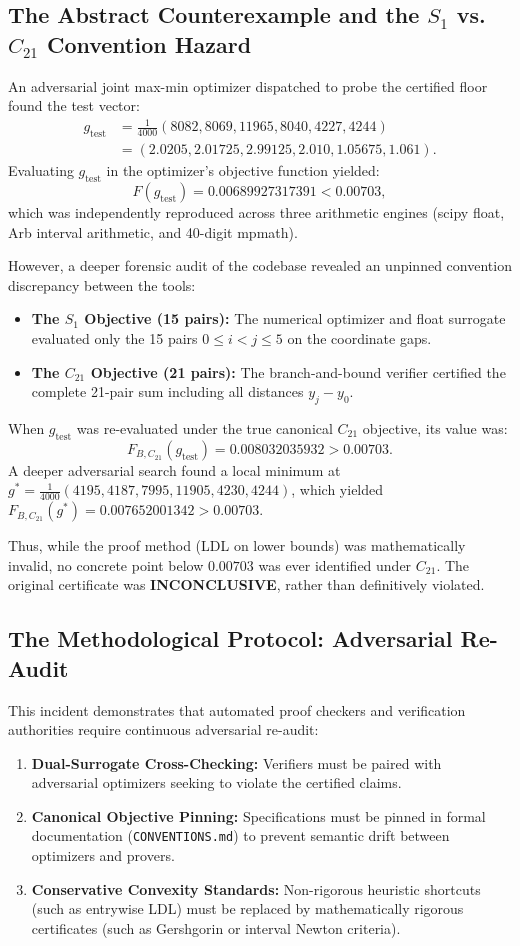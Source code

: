 \documentclass[11pt,a4paper]{article}
\theoremstyle{remark}
\begin{document}
\subsection{The Abstract Counterexample and the $S_1$ vs.\ $C_{21}$ Convention Hazard}
An adversarial joint max-min optimizer dispatched to probe the certified floor found the test vector:
\begin{align*}
 g_{\text{test}} &= \frac{1}{4000}\left(8082, 8069, 11965, 8040, 4227, 4244\right) \\
 &= \left(2.0205, 2.01725, 2.99125, 2.010, 1.05675, 1.061\right).
\end{align*}
Evaluating $g_{\text{test}}$ in the optimizer's objective function yielded:
\[
 F(g_{\text{test}}) = 0.00689927317391 < 0.00703,
\]
which was independently reproduced across three arithmetic engines (scipy float, Arb interval arithmetic, and 40-digit mpmath).

However, a deeper forensic audit of the codebase revealed an unpinned convention discrepancy between the tools:
\begin{itemize}
\item \textbf{The $S_1$ Objective (15 pairs):} The numerical optimizer and float surrogate evaluated only the 15 pairs $0 \le i < j \le 5$ on the coordinate gaps.
\item \textbf{The $C_{21}$ Objective (21 pairs):} The branch-and-bound verifier certified the complete 21-pair sum including all distances $y_j - y_0$.
\end{itemize}
When $g_{\text{test}}$ was re-evaluated under the true canonical $C_{21}$ objective, its value was:
\[
 F_{B, C_{21}}(g_{\text{test}}) = 0.008032035932 > 0.00703.
\]
A deeper adversarial search found a local minimum at $g^* = \frac{1}{4000}(4195, 4187, 7995, 11905, 4230, 4244)$, which yielded $F_{B, C_{21}}(g^*) = 0.007652001342 > 0.00703$. 

Thus, while the proof method (LDL on lower bounds) was mathematically invalid, no concrete point below $0.00703$ was ever identified under $C_{21}$. The original certificate was \textbf{INCONCLUSIVE}, rather than definitively violated.

\subsection{The Methodological Protocol: Adversarial Re-Audit}
This incident demonstrates that automated proof checkers and verification authorities require continuous adversarial re-audit:
\begin{enumerate}
\item \textbf{Dual-Surrogate Cross-Checking:} Verifiers must be paired with adversarial optimizers seeking to violate the certified claims.
\item \textbf{Canonical Objective Pinning:} Specifications must be pinned in formal documentation (\texttt{CONVENTIONS.md}) to prevent semantic drift between optimizers and provers.
\item \textbf{Conservative Convexity Standards:} Non-rigorous heuristic shortcuts (such as entrywise LDL) must be replaced by mathematically rigorous certificates (such as Gershgorin or interval Newton criteria).
\end{enumerate}
\end{document}
